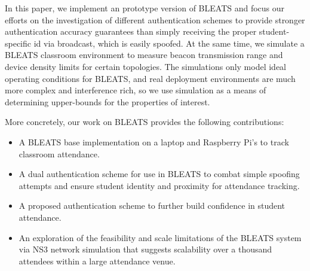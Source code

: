 In this paper, we implement an prototype version of BLEATS and focus our
efforts on the investigation of different authentication schemes to provide
stronger authentication accuracy guarantees than simply receiving the proper
student-specific id via broadcast, which is easily spoofed. At the same time,
we simulate a BLEATS classroom environment to measure beacon transmission range
and device density limits for certain topologies. The simulations only model
ideal operating conditions for BLEATS, and real deployment environments are
much more complex and interference rich, so we use simulation as a means of
determining upper-bounds for the properties of interest. 

More concretely, our work on BLEATS provides the following contributions:
\begin{itemize}

\item A BLEATS base implementation on a laptop and Raspberry Pi's to track
classroom attendance.  

\item A dual authentication scheme for use in BLEATS to combat simple spoofing
attempts and ensure student identity and proximity for attendance tracking.  

\item A proposed authentication scheme to further build confidence in student
attendance.  

\item An exploration of the feasibility and scale limitations of the BLEATS
system via NS3 network simulation that suggests scalability over a thousand
attendees within a large attendance venue. 

\end{itemize}
